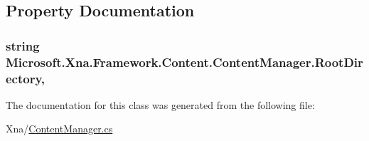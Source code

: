 \subsection{Property Documentation}
\hypertarget{class_microsoft_1_1_xna_1_1_framework_1_1_content_1_1_content_manager_a49b173b1768e9ecd170bc4cb54ad7886}{}
\subsubsection[{Root\+Directory}]{\setlength{\rightskip}{0pt plus 5cm}string Microsoft.\+Xna.\+Framework.\+Content.\+Content\+Manager.\+Root\+Directory\hspace{0.3cm}{\ttfamily [get]}, {\ttfamily [set]}}\label{class_microsoft_1_1_xna_1_1_framework_1_1_content_1_1_content_manager_a49b173b1768e9ecd170bc4cb54ad7886}


The documentation for this class was generated from the following file\+:\begin{DoxyCompactItemize}
\item 
Xna/\hyperlink{_content_manager_8cs}{Content\+Manager.\+cs}\end{DoxyCompactItemize}
